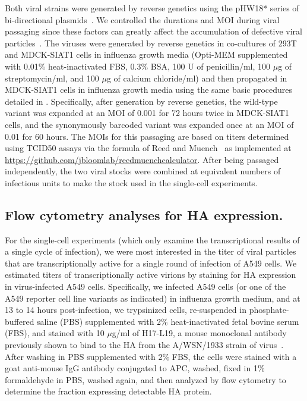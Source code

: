 \documentclass[]{asm-article}
\begin{document}
Both viral strains were generated by reverse genetics using the pHW18* series of bi-directional plasmids~\cite{hoffmann2000dna}.
We controlled the durations and MOI during viral passaging since these factors can greatly affect the accumulation of defective viral particles~\cite{xue2016propagation}.
The viruses were generated by reverse genetics in co-cultures of 293T and MDCK-SIAT1 cells in influenza growth media (Opti-MEM supplemented with 0.01\% heat-inactivated FBS, 0.3\% BSA, 100 U of penicillin/ml, 100 $\mu$g of streptomycin/ml, and 100 $\mu$g of calcium chloride/ml) and then propagated in MDCK-SIAT1 cells in influenza growth media using the same basic procedures detailed in \cite{russell2018extreme}.
Specifically, after generation by reverse genetics, the wild-type variant was expanded at an MOI of 0.001 for 72 hours twice in MDCK-SIAT1 cells, and the synonymously barcoded variant was expanded once at an MOI of 0.01 for 60 hours.
The MOIs for this passaging are based on titers determined using TCID50 assays via the formula of Reed and Muench~\cite{reed1938simple} as implemented at \url{https://github.com/jbloomlab/reedmuenchcalculator}.
After being passaged independently, the two viral stocks were combined at equivalent numbers of infectious units to make the stock used in the single-cell experiments.

\subsection{Flow cytometry analyses for HA expression.}
For the single-cell experiments (which only examine the transcriptional results of a single cycle of infection), we were most interested in the titer of viral particles that are transcriptionally active for a single round of infection of A549 cells.
We estimated titers of transcriptionally active virions by staining for HA expression in virus-infected A549 cells.
Specifically, we infected A549 cells (or one of the A549 reporter cell line variants as indicated) in influenza growth medium, and at 13 to 14 hours post-infection, we trypsinized cells, re-suspended in phosphate-buffered saline (PBS) supplemented with 2\% heat-inactivated fetal bovine serum (FBS), and stained with 10 $\mu$g/ml of H17-L19, a mouse monoclonal antibody previously shown to bind to the HA from the A/WSN/1933 strain of virus~\cite{doud2017complete}.
After washing in PBS supplemented with 2\% FBS, the cells were stained with a goat anti-mouse IgG antibody conjugated to APC, washed, fixed in 1\% formaldehyde in PBS, washed again, and then analyzed by flow cytometry to determine the fraction expressing detectable HA protein.
\end{document}
